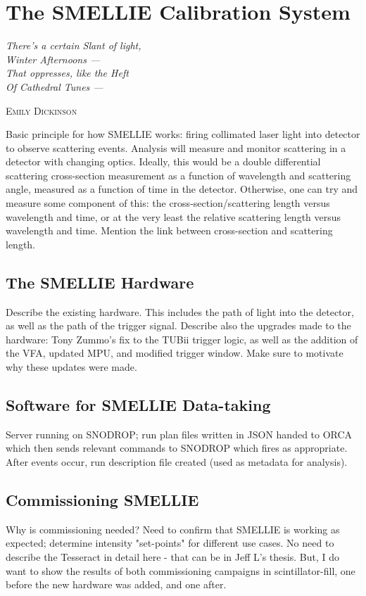 \chapter{The SMELLIE Calibration System}\label{chap:smellie_hardware}
\epigraph{\textit{There's a certain Slant of light,\\
Winter Afternoons ---\\
That oppresses, like the Heft\\
Of Cathedral Tunes ---}}{\textsc{Emily Dickinson}}
{
    \color{blue} Basic principle for how SMELLIE works: firing collimated laser light into detector to observe scattering events. Analysis will measure and monitor scattering in a detector with changing optics. Ideally, this would be a double differential scattering cross-section measurement as a function of wavelength and scattering angle, measured as a function of time in the detector. Otherwise, one can try and measure some component of this: the cross-section/scattering length versus wavelength and time, or at the very least the relative scattering length versus wavelength and time. Mention the link between cross-section and scattering length.
}
\section{The SMELLIE Hardware}
{
    \color{blue} Describe the existing hardware. This includes the path of light into the detector, as well as the path of the trigger signal. Describe also the upgrades made to the hardware: Tony Zummo's fix to the TUBii trigger logic, as well as the addition of the VFA, updated MPU, and modified trigger window. Make sure to motivate why these updates were made.
}
\section{Software for SMELLIE Data-taking}
{
    \color{blue} Server running on SNODROP; run plan files written in JSON handed to ORCA which then sends relevant commands to SNODROP which fires as appropriate. After events occur, run description file created (used as metadata for analysis).
}
\section{Commissioning SMELLIE}
{
    \color{blue} Why is commissioning needed? Need to confirm that SMELLIE is working as expected; determine intensity "set-points" for different use cases. No need to describe the Tesseract in detail here - that can be in Jeff L's thesis. But, I do want to show the results of both commissioning campaigns in scintillator-fill, one before the new hardware was added, and one after.
}